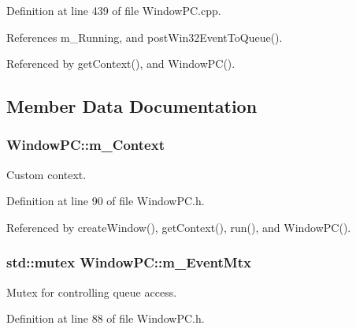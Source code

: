 Definition at line 439 of file Window\+P\+C.\+cpp.



References m\+\_\+\+Running, and post\+Win32\+Event\+To\+Queue().



Referenced by get\+Context(), and Window\+P\+C().



\subsection{Member Data Documentation}
\subsubsection[{\texorpdfstring{m\+\_\+\+Context}{m_Context}}]{ Window\+P\+C\+::m\+\_\+\+Context\hspace{0.3cm}{\ttfamily [private]}}\hypertarget{class_window_p_c_a7610d9a18a51203367a34c4391b170e9}{}\label{class_window_p_c_a7610d9a18a51203367a34c4391b170e9}


Custom context. 



Definition at line 90 of file Window\+P\+C.\+h.



Referenced by create\+Window(), get\+Context(), run(), and Window\+P\+C().

\subsubsection[{\texorpdfstring{m\+\_\+\+Event\+Mtx}{m_EventMtx}}]{\setlength{\rightskip}{0pt plus 5cm}std\+::mutex Window\+P\+C\+::m\+\_\+\+Event\+Mtx\hspace{0.3cm}{\ttfamily [private]}}\hypertarget{class_window_p_c_a1a277bf91c4c052094e7d6ec2005a2c1}{}\label{class_window_p_c_a1a277bf91c4c052094e7d6ec2005a2c1}


Mutex for controlling queue access. 



Definition at line 88 of file Window\+P\+C.\+h.

